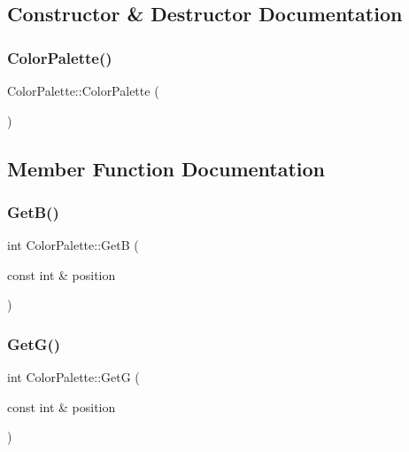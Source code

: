 \subsection{Constructor \& Destructor Documentation}
\mbox{\label{class_color_palette_a2851f9af4d13c5d760e36f6863bcffef}} 
\subsubsection{\texorpdfstring{Color\+Palette()}{ColorPalette()}}
{\footnotesize\ttfamily Color\+Palette\+::\+Color\+Palette (\begin{DoxyParamCaption}{ }\end{DoxyParamCaption})}



\subsection{Member Function Documentation}
\mbox{\label{class_color_palette_a51e71ba4f32b9240d63a7db8d54bbe60}} 
\subsubsection{\texorpdfstring{Get\+B()}{GetB()}}
{\footnotesize\ttfamily int Color\+Palette\+::\+GetB (\begin{DoxyParamCaption}\item[{const int \&}]{position }\end{DoxyParamCaption})}

\mbox{\label{class_color_palette_a2901366053f40b9a017058e2593e237a}} 
\subsubsection{\texorpdfstring{Get\+G()}{GetG()}}
{\footnotesize\ttfamily int Color\+Palette\+::\+GetG (\begin{DoxyParamCaption}\item[{const int \&}]{position }\end{DoxyParamCaption})}

